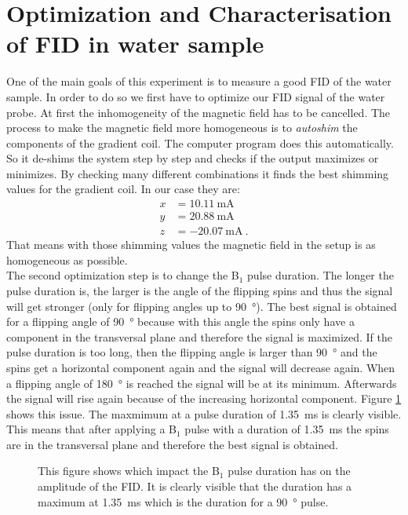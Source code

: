 \section{Optimization and Characterisation of FID in water sample}
\label{sec:OptimizationandCharacterisationofFIDinwatersample}

One of the main goals of this experiment is to measure a good FID of the water sample.
In order to do so we first have to optimize our FID signal of the water probe.\newline
At first the inhomogeneity of the magnetic field has to be cancelled.
The process to make the magnetic field more homogeneous is to \textit{autoshim} the components of the gradient coil.
The computer program does this automatically. So it de-shims the system step by step and checks if the output maximizes or minimizes.
By checking many different combinations it finds the best shimming values for the gradient coil.
In our case they are:
\begin{align*}
    x &= \SI{10.11}{\milli \ampere}\\
    y &= \SI{20.88}{\milli \ampere}\\
    z &= \SI{-20.07}{\milli \ampere} \ .
    \label{eq: shimmingvalues}
\end{align*}
That means with those shimming values the magnetic field in the setup is as homogeneous as possible.
\\
The second optimization step is to change the B$_1$ pulse duration.
The longer the pulse duration is, the larger is the angle of the flipping spins and thus the signal will get stronger (only for flipping angles up to \SI{90}{\degree}).
The best signal is obtained for a flipping angle of \SI{90}{\degree} because with this angle the spins only have a component in the transversal plane and therefore the signal is maximized.
If the pulse duration is too long, then the flipping angle is larger than \SI{90}{\degree} and the spins get a horizontal component again and the signal will decrease again.
When a flipping angle of \SI{180}{\degree} is reached the signal will be at its minimum.
Afterwards the signal will rise again because of the increasing horizontal component.
Figure \ref{fig:B1dauer} shows this issue.
The maxmimum at a pulse duration of \SI{1.35}{\milli \second} is clearly visible.
This means that after applying a B$_1$ pulse with a duration of \SI{1.35}{\milli \second} the spins are in the transversal plane and therefore the best signal is obtained.
\begin{figure}[H]
    \centering
    
    \caption[This figure shows which impact the B$_1$ pulse duration has on the amplitude of the FID.]{This figure shows which impact the B$_1$ pulse duration has on the amplitude of the FID.
    It is clearly visible that the duration has a maximum at \SI{1.35}{\milli \second} which is the duration for a \SI{90}{\degree} pulse.}
    \label{fig:B1dauer}
\end{figure}
